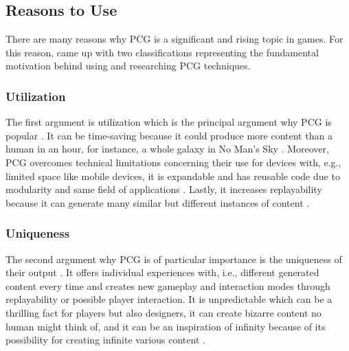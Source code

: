 \documentclass[MGS,Master,english]{twbook}%
\begin{document}
\subsection{Reasons to Use}
There are many reasons why PCG is a significant and rising topic in games. For this reason, \cite{pcg::inGameDesign} came up with two classifications representing the fundamental motivation behind using and researching PCG techniques.

\subsubsection{Utilization}
The first argument is utilization which is the principal argument why PCG is popular \cite{pcg::inGameDesign}. It can be time-saving because it could produce more content than a human in an hour, for instance, a whole galaxy in No Man’s Sky \cite{game::noMansSky} \cite{pcg::inGameDesign}. Moreover, PCG overcomes technical limitations concerning their use for devices with, e.g., limited space like mobile devices, it is expandable and has reusable code due to modularity and same field of applications \cite{pcg::inGameDesign}. Lastly, it increases replayability because it can generate many similar but different instances of content \cite{pcg::inGameDesign}.

\subsubsection{Uniqueness}
The second argument why PCG is of particular importance is the uniqueness of their output \cite{pcg::inGameDesign}. It offers individual experiences with, i.e., different generated content every time and creates new gameplay and interaction modes through replayability or possible player interaction. It is unpredictable which can be a thrilling fact for players but also designers, it can create bizarre content no human might think of, and it can be an inspiration of infinity because of its possibility for creating infinite various content \cite{pcg::inGameDesign}.
\end{document}
